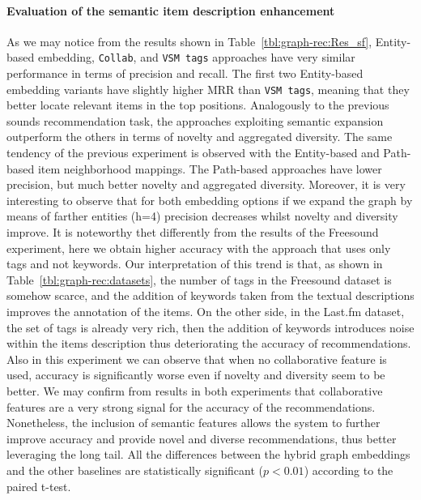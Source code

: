 \paragraph*{\textbf{Evaluation of the semantic item description enhancement}}\label{sem_eval}
As we may notice from the results shown in Table~\ref{tbl:graph-rec:Res_sf}, Entity-based embedding, \texttt{Collab}, and \texttt{VSM tags} approaches have very similar performance in terms of precision and recall. The first two Entity-based embedding variants have slightly higher MRR than \texttt{VSM tags}, meaning that they better locate relevant items in the top positions. Analogously to the previous sounds recommendation task, the approaches exploiting semantic expansion outperform the others in terms of novelty and aggregated diversity. The same tendency of the previous experiment is observed with the Entity-based and Path-based item neighborhood mappings. The Path-based approaches have lower precision, but much better novelty and aggregated diversity. Moreover, it is very interesting to observe that for both embedding options if we expand the graph by means of farther entities (h=4) precision decreases whilst novelty and diversity improve. It is noteworthy thet differently from the results of the Freesound experiment, here we obtain higher accuracy with the approach that uses only tags and not keywords. Our interpretation of this trend is that, as shown in Table~\ref{tbl:graph-rec:datasets}, the number of tags in the Freesound dataset is somehow scarce, and the addition of keywords taken from the textual descriptions improves the annotation of the items. On the other side, in the Last.fm dataset, the set of tags is already very rich, then the addition of keywords introduces noise within the items description thus deteriorating the accuracy of recommendations. 
Also in this experiment we can observe that when no collaborative feature is used, accuracy is significantly worse even if novelty and diversity seem to be better. 
We may confirm from results in both experiments that collaborative features are a very strong signal for the accuracy of the recommendations. Nonetheless, the inclusion of semantic features allows the system to further improve accuracy and provide novel and diverse recommendations, thus better leveraging the long tail. All the differences between the hybrid graph embeddings and the other baselines are statistically significant ($p<0.01$) according to the paired t-test.
